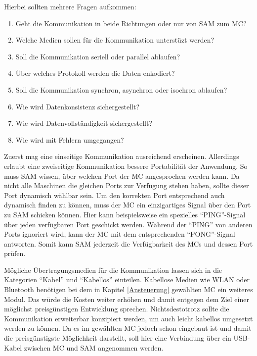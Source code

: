 Hierbei sollten mehrere Fragen aufkommen:
\begin{enumerate}
    \item Geht die Kommunikation in beide Richtungen oder nur von \ac{SAM} zum \ac{MC}?
    \item Welche Medien sollen für die Kommunikation unterstüzt werden?
    \item Soll die Kommunikation seriell oder parallel ablaufen?
    \item Über welches Protokoll werden die Daten enkodiert?
    \item Soll die Kommunikation synchron, asynchron oder isochron ablaufen?
    \item Wie wird Datenkonsistenz sichergestellt?
    \item Wie wird Datenvollständigkeit sichergestellt?
    \item Wie wird mit Fehlern umgegangen?
\end{enumerate}

Zuerst mag eine einseitige Kommunikation ausreichend erscheinen.
Allerdings erlaubt eine zweiseitige Kommunikation bessere Portabilität der Anwendung.
So muss \ac{SAM} wissen, über welchen Port der \ac{MC} angesprochen werden kann.
Da nicht alle Maschinen die gleichen Ports zur Verfügung stehen haben, sollte dieser Port dynamisch wählbar sein.
Um den korrekten Port entsprechend auch dynamisch finden zu können, muss der \ac{MC} ein einzigartiges Signal über den Port zu \ac{SAM} schicken können.
Hier kann beispielsweise ein spezielles \enquote{PING}-Signal über jeden verfügbaren Port geschickt werden.
Während der \enquote{PING} von anderen Ports ignoriert wird, kann der \ac{MC} mit dem entsprechenden \enquote{PONG}-Signal antworten.
Somit kann \ac{SAM} jederzeit die Verfügbarkeit des \ac{MC}s und dessen Port prüfen.

Mögliche Übertragungsmedien für die Kommunikation lassen sich in die Kategorien \enquote{Kabel} und \enquote{Kabellos} einteilen.
Kabellose Medien wie WLAN oder Bluetooth benötigen bei dem in Kapitel \ref{Ansteuerung} gewählten \ac{MC} ein weiteres Modul.
Das würde die Kosten weiter erhöhen und damit entgegen dem Ziel einer möglichst preisgünstigen Entwicklung sprechen.
Nichtsdestotrotz sollte die Kommunikation erweiterbar konzipiert werden, um auch leicht kabellos umgesetzt werden zu können.
Da es im gewählten \ac{MC} jedoch schon eingebaut ist und damit die preisgünstigste Möglichkeit darstellt, soll hier eine Verbindung über ein USB-Kabel zwischen \ac{MC} und \ac{SAM} angenommen werden.

